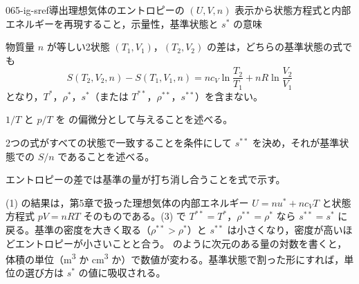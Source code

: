 \documentclass[uplatex,dvipdfmx,a4paper,11pt]{jsarticle}
\begin{document}
\begin{mondai}{065-ig-sref}{導出}{理想気体のエントロピーの $(U,V,n)$ 表示から状態方程式と内部エネルギーを再現すること，示量性，基準状態と $s^{*}$ の意味}
\begin{tadashii}
物質量 $n$ が等しい2状態 $(T_{1},V_{1})$，$(T_{2},V_{2})$ の差は，どちらの基準状態の式でも
\[ S(T_{2},V_{2},n) - S(T_{1},V_{1},n) = nc_{V}\ln\frac{T_{2}}{T_{1}} + nR\ln\frac{V_{2}}{V_{1}} \]
となり，$T^{*}$，$\rho^{*}$，$s^{*}$（または $T^{**}$，$\rho^{**}$，$s^{**}$）を含まない。
\begin{ronten}
  \item {} $1/T$ と $p/T$ を  の偏微分として与えることを述べる。
  \item {} 2つの式がすべての状態で一致することを条件にして $s^{**}$ を決め，それが基準状態での $S/n$ であることを述べる。
  \item {} エントロピーの差では基準の量が打ち消し合うことを式で示す。
\end{ronten}
\kenzan (1) の結果は，第5章で扱った理想気体の内部エネルギー $U = nu^{*} + nc_{V}T$ と状態方程式 $pV = nRT$ そのものである。(3) で $T^{**} = T^{*}$，$\rho^{**} = \rho^{*}$ なら $s^{**} = s^{*}$ に戻る。基準の密度を大きく取る（$\rho^{**} > \rho^{*}$）と $s^{**}$ は小さくなり，密度が高いほどエントロピーが小さいことと合う。
\tsumazuki {} のように次元のある量の対数を書くと，体積の単位（\unit{\metre\cubed} か \unit{\centi\metre\cubed} か）で数値が変わる。基準状態で割った形にすれば，単位の選び方は $s^{*}$ の値に吸収される。
\end{tadashii}
\end{mondai}

\noteowari
\end{document}
